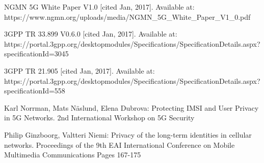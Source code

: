 \documentclass[lnicst,sechang,a4paper]{svmultln}
\begin{document}
\begin{thebibliography}{4}

 NGMN 5G White Paper V1.0 [cited Jan, 2017]. Available at: https://www.ngmn.org/uploads/media/NGMN\_5G\_White\_Paper\_V1\_0.pdf

 3GPP TR 33.899 V0.6.0 [cited Jan, 2017]. Available at: https://portal.3gpp.org/desktopmodules/Specifications/SpecificationDetails.aspx?\\specificationId=3045

 3GPP TR 21.905 [cited Jan, 2017]. Available at: https://portal.3gpp.org/desktopmodules/Specifications/SpecificationDetails.aspx?\\specificationId=558


 Karl Norrman, Mats Näslund, Elena Dubrova: Protecting IMSI and User Privacy in 5G Networks. 2nd International Workshop on 5G Security

 Philip Ginzboorg,  Valtteri Niemi: Privacy of the long-term identities in cellular networks. Proceedings of the 9th EAI International Conference on Mobile Multimedia Communications
Pages 167-175




\end{thebibliography}
\end{document}
